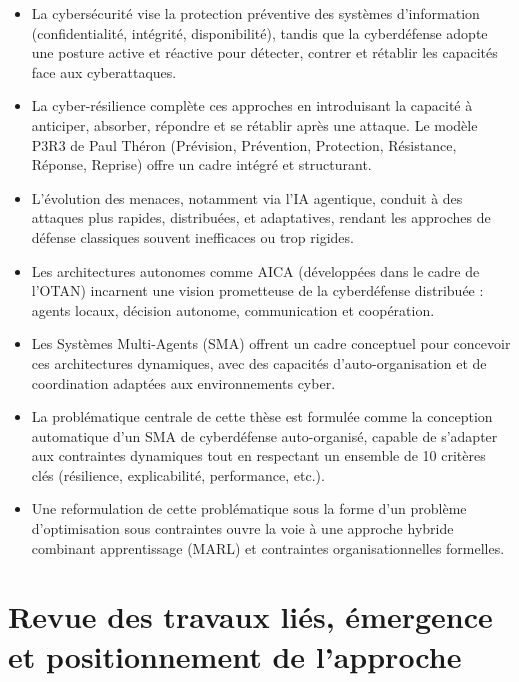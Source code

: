 \documentclass[ twoside,openright,titlepage,numbers=noenddot,headinclude,%
                footinclude=true,cleardoublepage=empty,abstractoff, %
                BCOR=5mm,paper=a4,fontsize=11pt,%
                french,american,%
                ]{scrreprt}
\begin{document}
\begin{tcolorbox}[colback=gray!5!white, colframe=gray!60!black, title={\faLightbulbO{} Points clés à retenir du Chapitre 1}]
\begin{itemize}
    \item La cybersécurité vise la protection préventive des systèmes d'information (confidentialité, intégrité, disponibilité), tandis que la cyberdéfense adopte une posture active et réactive pour détecter, contrer et rétablir les capacités face aux cyberattaques.
    
    \item La cyber-résilience complète ces approches en introduisant la capacité à anticiper, absorber, répondre et se rétablir après une attaque. Le modèle P3R3 de Paul Théron (Prévision, Prévention, Protection, Résistance, Réponse, Reprise) offre un cadre intégré et structurant.

    \item L'évolution des menaces, notamment via l'IA agentique, conduit à des attaques plus rapides, distribuées, et adaptatives, rendant les approches de défense classiques souvent inefficaces ou trop rigides.

    \item Les architectures autonomes comme AICA (développées dans le cadre de l’OTAN) incarnent une vision prometteuse de la cyberdéfense distribuée : agents locaux, décision autonome, communication et coopération.

    \item Les Systèmes Multi-Agents (SMA) offrent un cadre conceptuel pour concevoir ces architectures dynamiques, avec des capacités d’auto-organisation et de coordination adaptées aux environnements cyber.

    \item La problématique centrale de cette thèse est formulée comme la conception automatique d’un SMA de cyberdéfense auto-organisé, capable de s’adapter aux contraintes dynamiques tout en respectant un ensemble de 10 critères clés (résilience, explicabilité, performance, etc.).

    \item Une reformulation de cette problématique sous la forme d’un problème d’optimisation sous contraintes ouvre la voie à une approche hybride combinant apprentissage (MARL) et contraintes organisationnelles formelles.
\end{itemize}
\end{tcolorbox}


\chapter{Revue des travaux liés, émergence et positionnement de l'approche}
\end{document}
